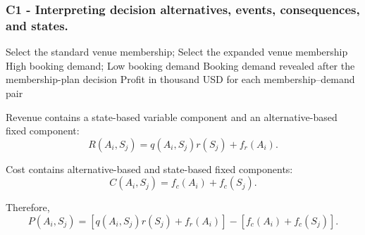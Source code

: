 	\subsubsection*{C1 - Interpreting decision alternatives, events, consequences, and states.}
	\label{subsec:problem12-community-venue-membership-c1}

	\DecisionElementsTable
	{Select the standard venue membership; Select the expanded venue membership}
	{High booking demand; Low booking demand}
	{Booking demand revealed after the membership-plan decision}
	{Profit in thousand USD for each membership--demand pair}

	Revenue contains a state-based variable component and an alternative-based
	fixed component:
	\[
	R(A_i,S_j)
	=
	q(A_i,S_j)r(S_j)+f_r(A_i).
	\]

	Cost contains alternative-based and state-based fixed components:
	\[
	C(A_i,S_j)
	=
	f_c(A_i)+f_c(S_j).
	\]

	Therefore,
	\[
	P(A_i,S_j)
	=
	\left[
	q(A_i,S_j)r(S_j)+f_r(A_i)
	\right]
	-
	\left[
	f_c(A_i)+f_c(S_j)
	\right].
	\]


